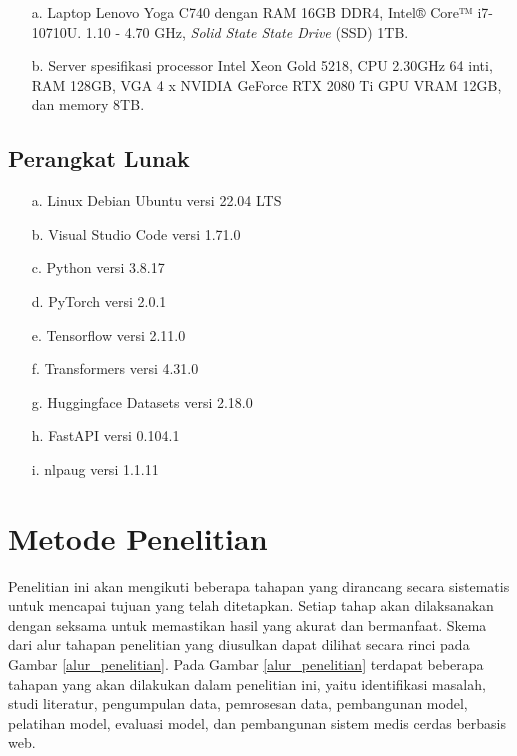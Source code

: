 \begin{enumerate}
	\item[a.] Laptop Lenovo Yoga C740 dengan RAM 16GB DDR4, Intel® Core™ i7-10710U. 1.10 - 4.70 GHz, \textit{Solid State State Drive} (SSD) 1TB.

    \item[b.] Server spesifikasi processor Intel Xeon Gold 5218, CPU 2.30GHz 64 inti, RAM 128GB, VGA 4 x NVIDIA GeForce RTX 2080 Ti GPU VRAM 12GB, dan memory 8TB.
\end{enumerate}

\subsection{Perangkat Lunak}
\begin{enumerate}
    \item[a.] Linux Debian Ubuntu versi 22.04 LTS
    \item[b.] Visual Studio Code versi 1.71.0
    \item[c.] Python versi 3.8.17
    \item[d.] PyTorch versi 2.0.1
    \item[e.] Tensorflow versi 2.11.0
    \item[f.] Transformers versi 4.31.0
    \item[g.] Huggingface Datasets versi 2.18.0
    \item[h.] FastAPI versi 0.104.1
    \item[i.] nlpaug versi 1.1.11
    

\end{enumerate}



\section{Metode Penelitian}

\par Penelitian ini akan mengikuti beberapa tahapan yang dirancang secara sistematis untuk mencapai tujuan yang telah ditetapkan. Setiap tahap akan dilaksanakan dengan seksama untuk memastikan hasil yang akurat dan bermanfaat. Skema dari alur tahapan penelitian yang diusulkan dapat dilihat secara rinci pada Gambar \ref{alur_penelitian}. Pada Gambar \ref{alur_penelitian} terdapat beberapa tahapan yang akan dilakukan dalam penelitian ini, yaitu identifikasi masalah, studi literatur, pengumpulan data, pemrosesan data, pembangunan model, pelatihan model, evaluasi model, dan pembangunan sistem medis cerdas berbasis web.

